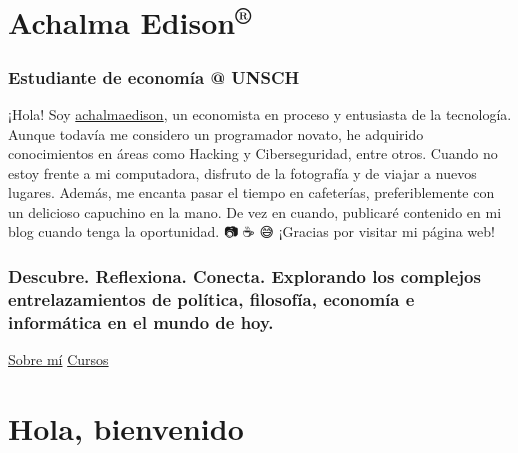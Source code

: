 \documentclass[
  letterpaper,
]{article}
\author{}
\date{}
\begin{document}
\ifdefined\Shaded\renewenvironment{Shaded}{\begin{tcolorbox}[frame hidden, borderline west={3pt}{0pt}{shadecolor}, enhanced, sharp corners, breakable, boxrule=0pt, interior hidden]}{\end{tcolorbox}}\fi

\hypertarget{achalma-edison}{%
\section{\texorpdfstring{Achalma
Edison\textsuperscript{{®}}}{Achalma Edison®}}\label{achalma-edison}}

\hypertarget{estudiante-de-economuxeda-unsch}{%
\subsubsection{Estudiante de economía @
UNSCH}\label{estudiante-de-economuxeda-unsch}}

¡Hola! Soy \href{https://achalmaedison.netlify.app/}{achalmaedison}, un
economista en proceso y entusiasta de la tecnología. Aunque todavía me
considero un programador novato, he adquirido conocimientos en áreas
como Hacking y Ciberseguridad, entre otros. Cuando no estoy frente a mi
computadora, disfruto de la fotografía y de viajar a nuevos lugares.
Además, me encanta pasar el tiempo en cafeterías, preferiblemente con un
delicioso capuchino en la mano. De vez en cuando, publicaré contenido en
mi blog cuando tenga la oportunidad. 📷 ☕ ️😅 ¡Gracias por visitar mi
página web!

\hypertarget{descubre.-reflexiona.-conecta.-explorando-los-complejos-entrelazamientos-de-poluxedtica-filosofuxeda-economuxeda-e-informuxe1tica-en-el-mundo-de-hoy.}{%
\subsubsection{Descubre. Reflexiona. Conecta. Explorando los complejos
entrelazamientos de política, filosofía, economía e informática en el
mundo de
hoy.}\label{descubre.-reflexiona.-conecta.-explorando-los-complejos-entrelazamientos-de-poluxedtica-filosofuxeda-economuxeda-e-informuxe1tica-en-el-mundo-de-hoy.}}

\href{docs/get-started/}{Sobre mí}
\protect\hypertarget{btn-guide}{\href{docs/guide/}{Cursos}}

\hypertarget{hola-bienvenido}{%
\section{Hola, bienvenido}\label{hola-bienvenido}}
\end{document}
